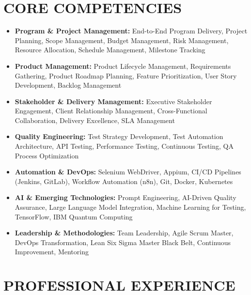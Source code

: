 \documentclass[11pt,a4paper]{article}
\begin{document}
\section*{CORE COMPETENCIES}
\begin{itemize}[leftmargin=*, itemsep=0pt]
    \item \textbf{Program \& Project Management:} End-to-End Program Delivery, Project Planning, Scope Management, Budget Management, Risk Management, Resource Allocation, Schedule Management, Milestone Tracking
    \item \textbf{Product Management:} Product Lifecycle Management, Requirements Gathering, Product Roadmap Planning, Feature Prioritization, User Story Development, Backlog Management
    \item \textbf{Stakeholder \& Delivery Management:} Executive Stakeholder Engagement, Client Relationship Management, Cross-Functional Collaboration, Delivery Excellence, SLA Management
    \item \textbf{Quality Engineering:} Test Strategy Development, Test Automation Architecture, API Testing, Performance Testing, Continuous Testing, QA Process Optimization
    \item \textbf{Automation \& DevOps:} Selenium WebDriver, Appium, CI/CD Pipelines (Jenkins, GitLab), Workflow Automation (n8n), Git, Docker, Kubernetes
    \item \textbf{AI \& Emerging Technologies:} Prompt Engineering, AI-Driven Quality Assurance, Large Language Model Integration, Machine Learning for Testing, TensorFlow, IBM Quantum Computing
    \item \textbf{Leadership \& Methodologies:} Team Leadership, Agile Scrum Master, DevOps Transformation, Lean Six Sigma Master Black Belt, Continuous Improvement, Mentoring
\end{itemize}

\section*{PROFESSIONAL EXPERIENCE}
\end{document}
